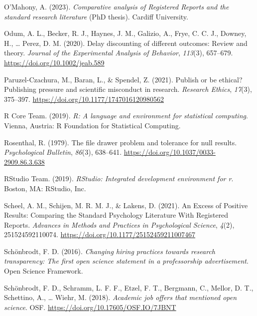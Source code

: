 \documentclass[
  ,man,mask,floatsintext]{apa6}
\newlength{\cslhangindent}
\newlength{\cslentryspacingunit} %
\newenvironment{CSLReferences}[2] %
 {%
  \setlength{\parindent}{0pt}
  \ifodd #1
  \let\oldpar\par
  \def\par{\hangindent=\cslhangindent\oldpar}
  \fi
  \setlength{\parskip}{#2\cslentryspacingunit}
 }%
 {}
\begin{document}
\begin{CSLReferences}{1}{0}
\leavevmode{}%
O'Mahony, A. (2023). \emph{Comparative analysis of {Registered Reports} and the standard research literature} (PhD thesis). Cardiff University.

\leavevmode{}%
Odum, A. L., Becker, R. J., Haynes, J. M., Galizio, A., Frye, C. C. J., Downey, H., \ldots{} Perez, D. M. (2020). Delay discounting of different outcomes: {Review} and theory. \emph{Journal of the Experimental Analysis of Behavior}, \emph{113}(3), 657--679. \url{https://doi.org/10.1002/jeab.589}

\leavevmode{}%
Paruzel-Czachura, M., Baran, L., \& Spendel, Z. (2021). Publish or be ethical? {Publishing} pressure and scientific misconduct in research. \emph{Research Ethics}, \emph{17}(3), 375--397. \url{https://doi.org/10.1177/1747016120980562}

\leavevmode{}%
R Core Team. (2019). \emph{R: {A} language and environment for statistical computing}. Vienna, Austria: R Foundation for Statistical Computing.

\leavevmode{}%
Rosenthal, R. (1979). The file drawer problem and tolerance for null results. \emph{Psychological Bulletin}, \emph{86}(3), 638--641. \url{https://doi.org/10.1037/0033-2909.86.3.638}

\leavevmode{}%
RStudio Team. (2019). \emph{{RStudio}: {Integrated} development environment for r}. Boston, MA: RStudio, Inc.

\leavevmode{}%
Scheel, A. M., Schijen, M. R. M. J., \& Lakens, D. (2021). An {Excess} of {Positive Results}: {Comparing} the {Standard Psychology Literature With Registered Reports}. \emph{Advances in Methods and Practices in Psychological Science}, \emph{4}(2), 251524592110074. \url{https://doi.org/10.1177/25152459211007467}

\leavevmode{}%
Schönbrodt, F. D. (2016). \emph{Changing hiring practices towards research transparency: {The} first open science statement in a professorship advertisement}. Open Science Framework.

\leavevmode{}%
Schönbrodt, F. D., Schramm, L. F. F., Etzel, F. T., Bergmann, C., Mellor, D. T., Schettino, A., \ldots{} Wiehr, M. (2018). \emph{Academic job offers that mentioned open science}. OSF. \url{https://doi.org/10.17605/OSF.IO/7JBNT}


\end{CSLReferences}
\end{document}
